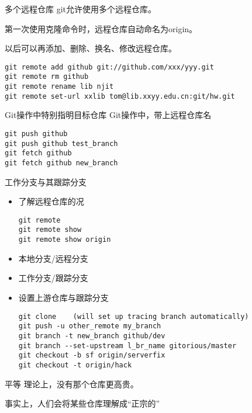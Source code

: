 \begin{frame}[fragile]{多个远程仓库}
git允许使用多个远程仓库。

第一次使用克隆命令时，远程仓库自动命名为origin。

以后可以再添加、删除、换名、修改远程仓库。

\begin{Verbatim}[frame=single,commandchars=\\\{\}]
git remote add github git://github.com/xxx/yyy.git
git remote rm github
git remote rename lib njit
git remote set-url xxlib tom@lib.xxyy.edu.cn:git/hw.git
\end{Verbatim}
\end{frame}

\begin{frame}[fragile]{Git操作中特别指明目标仓库}
Git操作中，带上远程仓库名

\begin{Verbatim}[frame=single,commandchars=\\\{\}]
git push github
git push github test_branch
git fetch github
git fetch github new_branch
\end{Verbatim}
\end{frame}

\begin{frame}[<+->][fragile]{工作分支与其跟踪分支}
    \begin{itemize}
        \item 了解远程仓库的况
        \begin{Verbatim}[frame=single,commandchars=\\\{\}]
git remote
git remote show
git remote show origin
        \end{Verbatim}
        \item 本地分支/远程分支
        \item 工作分支/跟踪分支
        \item 设置上游仓库与跟踪分支

        \begin{Verbatim}[frame=single,commandchars=\\\{\}]
git clone    (will set up tracing branch automatically)
git push -u other_remote my_branch
git branch -t new_branch github/dev
git branch --set-upstream l_br_name gitorious/master
git checkout -b sf origin/serverfix
git checkout -t origin/hack
        \end{Verbatim}
    \end{itemize}
\end{frame}

\begin{frame}[<+->][fragile]{平等}
\onslide<+->
理论上，没有那个仓库更高贵。

\onslide<+->
事实上，人们会将某些仓库理解成“正宗的”
\end{frame}
